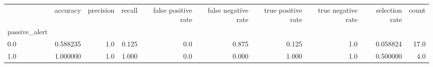 \begin{tabular}{lrrrrrrrrr}
\toprule
{} &  accuracy &  precision &  recall &  false positive rate &  false negative rate &  true positive rate &  true negative rate &  selection rate &  count \\
passive\_alert &           &            &         &                      &                      &                     &                     &                 &        \\
\midrule
0.0           &  0.588235 &        1.0 &   0.125 &                  0.0 &                0.875 &               0.125 &                 1.0 &        0.058824 &   17.0 \\
1.0           &  1.000000 &        1.0 &   1.000 &                  0.0 &                0.000 &               1.000 &                 1.0 &        0.500000 &    4.0 \\
\bottomrule
\end{tabular}
